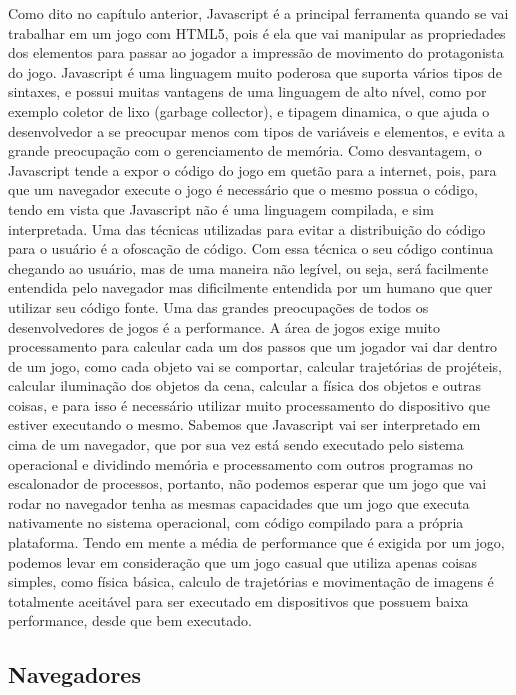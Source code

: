 Como dito no capítulo anterior, Javascript é a principal ferramenta
quando se vai trabalhar em um jogo com HTML5, pois é ela que vai
manipular as propriedades dos elementos para passar ao jogador a
impressão de movimento do protagonista do jogo.
Javascript é uma linguagem muito poderosa que suporta vários tipos de
sintaxes, e possui muitas vantagens de uma linguagem de alto nível,
como por exemplo coletor de lixo (garbage collector), e tipagem
dinamica, o que ajuda o desenvolvedor a se preocupar menos com tipos
de variáveis e elementos, e evita a grande preocupação com o
gerenciamento de memória.
Como desvantagem, o Javascript tende a expor o código do jogo em
quetão para a internet, pois, para que um navegador execute o jogo é
necessário que o mesmo possua o código, tendo em vista que Javascript
não é uma linguagem compilada, e sim interpretada. Uma das técnicas
utilizadas para evitar a distribuição do código para o usuário é a
ofoscação de código. Com essa técnica o seu código continua chegando
ao usuário, mas de uma maneira não legível, ou seja, será facilmente
entendida pelo navegador mas dificilmente entendida por um humano que
quer utilizar seu código fonte.
Uma das grandes preocupações de todos os desenvolvedores de jogos é a
performance. A área de jogos exige muito processamento para calcular
cada um dos passos que um jogador vai dar dentro de um jogo, como cada
objeto vai se comportar, calcular trajetórias de projéteis, calcular
iluminação dos objetos da cena, calcular a física dos objetos e outras
coisas, e para isso é necessário utilizar muito processamento do
dispositivo que estiver executando o mesmo. Sabemos que Javascript vai
ser interpretado em cima de um navegador, que por sua vez está sendo
executado pelo sistema operacional e dividindo memória e processamento
com outros programas no escalonador de processos, portanto, não
podemos esperar que um jogo que vai rodar no navegador tenha as mesmas
capacidades que um jogo que executa nativamente no sistema
operacional, com código compilado para a própria plataforma.
Tendo em mente a média de performance que é exigida por um jogo,
podemos levar em consideração que um jogo casual que utiliza apenas
coisas simples, como física básica, calculo de trajetórias e
movimentação de imagens é totalmente aceitável para ser executado em
dispositivos que possuem baixa performance, desde que bem executado.

\subsection{Navegadores}

